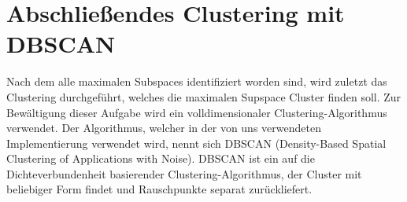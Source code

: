\section{Abschließendes Clustering mit DBSCAN}\label{sec:chap6}

Nach dem alle maximalen Subspaces identifiziert worden sind, wird zuletzt das Clustering durchgeführt, welches die maximalen Supspace Cluster finden soll. Zur Bewältigung dieser Aufgabe wird ein volldimensionaler Clustering-Algorithmus verwendet. Der Algorithmus, welcher in der von uns verwendeten Implementierung verwendet wird, nennt sich DBSCAN (Density-Based Spatial Clustering of Applications with Noise). DBSCAN ist ein auf die Dichteverbundenheit basierender Clustering-Algorithmus, der Cluster mit beliebiger Form findet und Rauschpunkte separat zurückliefert.
